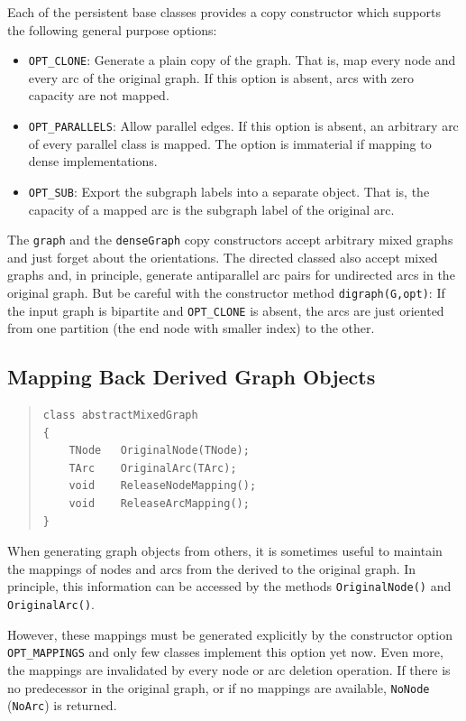 \documentclass[a4paper,11pt,twoside]{book}
\begin{document}
\begin{multicols}{2}
Each of the persistent base classes provides a copy constructor which supports
the following general purpose options:
\begin{itemize}
\item \verb/OPT_CLONE/: Generate a plain copy of the graph. That is, map
    every node and every arc of the original graph. If this option is absent,
    arcs with zero capacity are not mapped.
\item \verb/OPT_PARALLELS/: Allow parallel edges. If this option is absent,
    an arbitrary arc of every parallel class is mapped. The option is
    immaterial if mapping to dense implementations.
\item \verb/OPT_SUB/: Export the subgraph labels into a separate object. That
    is, the capacity of a mapped arc is the subgraph label of the original arc.
\end{itemize}
The \verb/graph/ and the \verb/denseGraph/ copy constructors accept arbitrary
mixed graphs and just forget about the orientations. The directed classed also
accept mixed graphs and, in principle, generate antiparallel arc pairs for
undirected arcs in the original graph. But be careful with the constructor
method \verb/digraph(G,opt)/: If the input graph is bipartite and
\verb/OPT_CLONE/ is absent, the arcs are just oriented from one partition
(the end node with smaller index) to the other.


\subsection{Mapping Back Derived Graph Objects}
\methods
\begin{quote}
\begin{verbatim}
class abstractMixedGraph
{
    TNode   OriginalNode(TNode);
    TArc    OriginalArc(TArc);
    void    ReleaseNodeMapping();
    void    ReleaseArcMapping();
}
\end{verbatim}
\end{quote}
When generating graph objects from others, it is sometimes useful to
maintain the mappings of nodes and arcs from the derived to the original
graph. In principle, this information can be accessed by the methods
\verb/OriginalNode()/ and \verb/OriginalArc()/.

However, these mappings must be generated explicitly by the constructor option
\verb/OPT_MAPPINGS/ and only few classes implement this option yet now. Even
more, the mappings are invalidated by every node or arc deletion operation.
If there is no predecessor in the original graph, or if no mappings are
available, \verb/NoNode/ (\verb/NoArc/) is returned.



\end{multicols}
\end{document}
